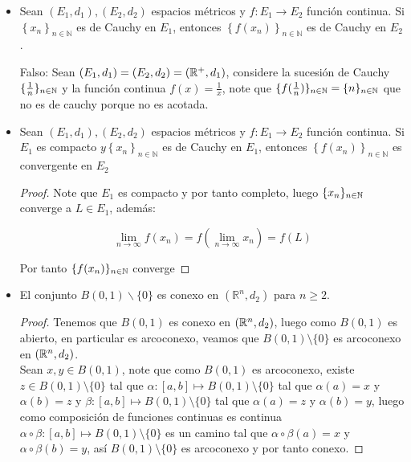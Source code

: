 \begin{itemize}[label={✎},leftmargin=*]
\begin{proof}
En efecto como $f$ es continua y $K$ es compacto, $f(K)$ es compacto, por tanto es cerrado y acotado.
\end{proof}

\item  Sean $\left(E_1, d_1\right),\left(E_2, d_2\right)$ espacios métricos y $f: E_1 \rightarrow E_2$ función continua. Si $\left\{x_n\right\}_{n \in \mathbb{N}}$ es de Cauchy en $E_1$, entonces $\left\{f\left(x_n\right)\right\}_{n \in \mathbb{N}}$ es de Cauchy en $E_2$.

Falso: Sean $(E_1,d_1)=(E_2,d_2)=(\mathbb{R}^+,d_1)$, considere la sucesión de Cauchy $\{\frac{1}{n}\}_{n\in \mathbb{N}}$ y la función continua $f(x)=\frac{1}{x}$, note que $\{f(\frac{1}{n})\}_{n\in \mathbb{N}}=\{n\}_{n\in \mathbb{N}}$ que no es de cauchy porque no es acotada.

\item Sean $\left(E_1, d_1\right),\left(E_2, d_2\right)$ espacios métricos y $f: E_1 \rightarrow E_2$ función continua. Si $E_1$ es compacto $y\left\{x_n\right\}_{n \in \mathbb{N}}$ es de Cauchy en $E_1$, entonces $\left\{f\left(x_n\right)\right\}_{n \in \mathbb{N}}$ es convergente en $E_2$\\

\begin{proof}
Note que $E_1$ es compacto y por tanto completo, luego $\{x_n\}_{n\in\mathbb{N}}$ converge a $L \in E_1$, además:

$$\lim_{n\to \infty}f(x_n)=f\left(\lim_{n\to \infty} x_n\right)=f(L)$$

Por tanto $\{f(x_n)\}_{n\in \mathbb{N}}$ converge
\end{proof}

\item El conjunto $B(0,1) \backslash\{0\}$ es conexo en $\left(\mathbb{R}^n, d_2\right)$ para $n \geq 2$.\\

\begin{proof}
Tenemos que $B(0,1)$ es conexo en $(\mathbb{R}^n,d_2)$, luego como $B(0,1)$ es abierto, en particular es arcoconexo, veamos que $B(0,1)\setminus \{0\}$ es arcoconexo en $(\mathbb{R}^n,d_2)$.\\

Sean $x,y\in B(0,1)$, note que como $B(0,1)$ es arcoconexo, existe $z\in B(0,1)\setminus\{0\}$ tal que $\alpha: [a,b]\mapsto B(0,1)\setminus\{0\}$ tal que $\alpha(a)=x$ y $\alpha(b)=z$ y $\beta: [a,b]\mapsto B(0,1)\setminus\{0\}$ tal que $\alpha(a)=z$ y $\alpha(b)=y$, luego como composición de funciones continuas es continua $\alpha \circ \beta: [a,b]\mapsto B(0,1)\setminus \{0\}$ es un camino tal que $\alpha \circ \beta (a)=x$ y $\alpha \circ \beta(b)=y$, así $B(0,1)\setminus \{0\}$ es arcoconexo y por tanto conexo. 
\end{proof}


\end{itemize}
